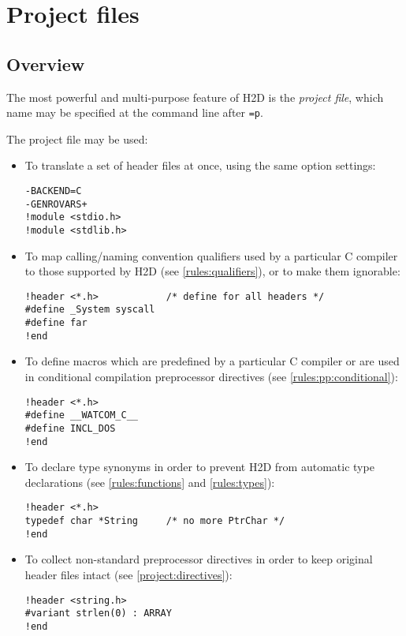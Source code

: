\chapter{Project files}
\label{project}

\section{Overview}

The most powerful and multi-purpose feature of H2D is the {\em project file},
which name may be specified at the command line after \verb'=p'.

The project file may be used:
\begin{itemize}
\item To translate a set of header files at once, using the same option
      settings:

\verb'-BACKEND=C'\\
\verb'-GENROVARS+'\\
\verb'!module <stdio.h>'\\
\verb'!module <stdlib.h>'

\item To map calling/naming convention qualifiers used by a particular C
      compiler to those supported by H2D (see \ref{rules:qualifiers}),
      or to make them ignorable:

\verb'!header <*.h>            /* define for all headers */'\\
\verb'#define _System syscall'\\
\verb'#define far'\\
\verb'!end'

\item To define macros which are predefined by a particular
      C compiler or are used in conditional compilation preprocessor
      directives (see \ref{rules:pp:conditional}):

\verb'!header <*.h>'\\
\verb'#define __WATCOM_C__'\\
\verb'#define INCL_DOS'\\
\verb'!end'

\item To declare type synonyms in order to prevent H2D from automatic
      type declarations (see \ref{rules:functions} and \ref{rules:types}):

\verb'!header <*.h>'\\
\verb'typedef char *String     /* no more PtrChar */'\\                   %
\verb'!end'

\item To collect non-standard preprocessor directives in order to keep
      original header files intact (see \ref{project:directives}):

\verb'!header <string.h>'\\
\verb'#variant strlen(0) : ARRAY'\\
\verb'!end'

\end{itemize}


